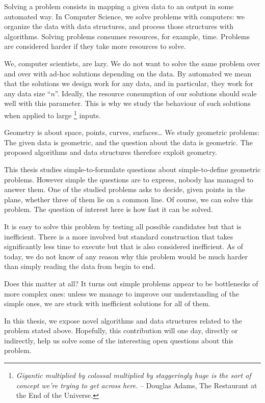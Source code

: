 

Solving a problem consists in mapping a given data to an output in some
automated way.
In Computer Science, we solve problems with computers: we organize the data
with data structures, and process those structures with algorithms.
%
Solving problems consumes resources, for example, time.
Problems are considered harder if they take more resources to solve.

We, computer scientists, are lazy. We do not want to solve the same problem
over and over with ad-hoc solutions depending on the data.
%
By automated we mean that the solutions we
design work for any data, and in particular, they work for any data size
``\(n\)''.
%
Ideally, the resource consumption of our solutions should scale well with this
parameter.
%
This is why we study the behaviour of such solutions when applied to large%
\footnote{%
\emph{
	Gigantic multiplied by colossal multiplied by staggeringly
	huge is the sort of concept we're trying to get across here.
}-- Douglas Adams, The Restaurant at the End of the Universe.
}
inputs.

Geometry is about space, points, curves, surfaces\dots
We study geometric problems:
%
The given data is geometric, and the question about the data is geometric.
The proposed algorithms and data structures therefore exploit geometry.

This thesis studies simple-to-formulate questions about simple-to-define
geometric problems.
%
However simple the questions are to express, nobody has managed to answer them.
%
One of the studied problems asks to decide, given points in the plane,
whether three of them lie on a common line.
%
Of course, we can solve this problem.
%
The question of interest here is how fast it can be solved.

It is easy to solve this problem by testing all possible candidates but that is
inefficient. There is a
more involved but standard construction that takes significantly less time to
execute but that is also considered inefficient. As of today, we do not know of
any reason why this problem would be much harder than simply
reading the data from begin to end.

Does this matter at all? It turns out simple problems appear to
be bottlenecks of more complex ones: unless we manage to improve our
understanding of the simple ones, we are stuck with inefficient solutions for
all of them.

In this thesis, we expose novel algorithms and data structures related to the
problem stated above.
%
Hopefully, this contribution will one day, directly or indirectly, help us
solve some of the interesting open questions about this problem.
